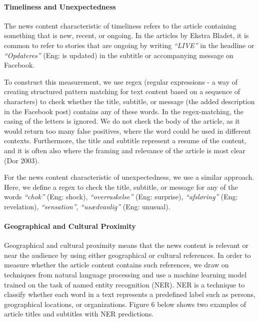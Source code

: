 \documentclass[
]{article}
\begin{document}
\hypertarget{timeliness-and-unexpectedness}{%
\paragraph*{Timeliness and
Unexpectedness}\label{timeliness-and-unexpectedness}}

\hspace{-2.5em}

\noindent The news content characteristic of timeliness refers to the
article containing something that is new, recent, or ongoing. In the
articles by Ekstra Bladet, it is common to refer to stories that are
ongoing by writing \emph{``LIVE''} in the headline or
\emph{``Opdateres''} (Eng: is updated) in the subtitle or accompanying
message on Facebook.

To construct this measurement, we use regex (regular expressions - a way
of creating structured pattern matching for text content based on a
sequence of characters) to check whether the title, subtitle, or message
(the added description in the Facebook post) contains any of these
words. In the regex-matching, the casing of the letters is ignored. We
do not check the body of the article, as it would return too many false
positives, where the word could be used in different contexts.
Furthermore, the title and subtitle represent a resume of the content,
and it is often also where the framing and relevance of the article is
most clear (Dor 2003).

For the news content characteristic of unexpectedness, we use a similar
approach. Here, we define a regex to check the title, subtitle, or
message for any of the words \emph{``chok''} (Eng: shock),
\emph{``overraskelse''} (Eng: surprise), \emph{``afsløring''} (Eng:
revelation), \emph{``sensation''}, \emph{``usædvanlig''} (Eng: unusual).

\hypertarget{geographical-and-cultural-proximity}{%
\paragraph*{Geographical and Cultural
Proximity}\label{geographical-and-cultural-proximity}}

\hspace{-2.5em}

\noindent Geographical and cultural proximity means that the news
content is relevant or near the audience by using either geographical or
cultural references. In order to measure whether the article content
contains such references, we draw on techniques from natural language
processing and use a machine learning model trained on the task of named
entity recognition (NER). NER is a technique to classify whether each
word in a text represents a predefined label such as persons,
geographical locations, or organizations. Figure 6 below shows two
examples of article titles and subtitles with NER predictions.
\end{document}
